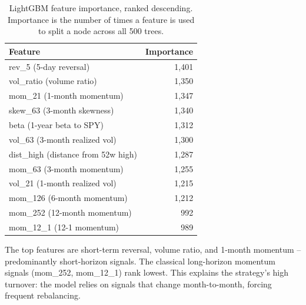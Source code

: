 \documentclass[11pt]{article}
\begin{document}
\begin{table}[h]
\centering
\caption{LightGBM feature importance, ranked descending. Importance is the number of
times a feature is used to split a node across all 500 trees.}
\label{tab:fi}
\begin{tabular}{lr}
\toprule
Feature & Importance \\
\midrule
rev\_5 (5-day reversal)         & 1{,}401 \\
vol\_ratio (volume ratio)        & 1{,}350 \\
mom\_21 (1-month momentum)       & 1{,}347 \\
skew\_63 (3-month skewness)      & 1{,}340 \\
beta (1-year beta to SPY)        & 1{,}312 \\
vol\_63 (3-month realized vol)   & 1{,}300 \\
dist\_high (distance from 52w high) & 1{,}287 \\
mom\_63 (3-month momentum)       & 1{,}255 \\
vol\_21 (1-month realized vol)   & 1{,}215 \\
mom\_126 (6-month momentum)      & 1{,}212 \\
mom\_252 (12-month momentum)     & \phantom{1}992 \\
mom\_12\_1 (12-1 momentum)       & \phantom{1}989 \\
\bottomrule
\end{tabular}
\end{table}

The top features are short-term reversal, volume ratio, and 1-month momentum --
predominantly short-horizon signals. The classical long-horizon momentum signals
(mom\_252, mom\_12\_1) rank lowest. This explains the strategy's high turnover: the
model relies on signals that change month-to-month, forcing frequent rebalancing.
\end{document}

